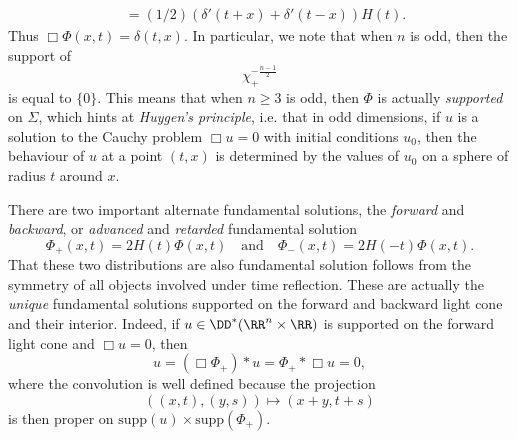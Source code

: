 \begin{example}
\begin{align*}
        &= (1/2) \left( \delta'(t + x) + \delta'(t - x) \right) H(t).
    \end{align*}
    Thus $\Box \Phi(x,t) = \delta(t,x)$. In particular, we note that when $n$ is odd, then the support of
    \[ \chi_+^{- \frac{n-1}{2}} \]
    is equal to $\{ 0 \}$. This means that when $n \geq 3$ is odd, then $\Phi$ is actually \emph{supported} on $\Sigma$, which hints at \emph{Huygen's principle}, i.e. that in odd dimensions, if $u$ is a solution to the Cauchy problem $\Box u = 0$ with initial conditions $u_0$, then the behaviour of $u$ at a point $(t,x)$ is determined by the values of $u_0$ on a sphere of radius $t$ around $x$.

    There are two important alternate fundamental solutions, the \emph{forward} and \emph{backward}, or \emph{advanced} and \emph{retarded} fundamental solution
    \[ \Phi_+(x,t) = 2 H(t) \Phi(x,t) \quad\text{and}\quad \Phi_-(x,t) = 2 H(-t) \Phi(x,t). \]
    That these two distributions are also fundamental solution follows from the symmetry of all objects involved under time reflection. These are actually the \emph{unique} fundamental solutions supported on the forward and backward light cone and their interior. Indeed, if $u \in \DD^*(\RR^n \times \RR)$ is supported on the forward light cone and $\Box u = 0$, then
    \[ u = (\Box \Phi_+) * u = \Phi_+ * \Box u = 0, \]
    where the convolution is well defined because the projection
    \[ ((x,t), (y,s)) \mapsto (x + y, t + s) \]
    is then proper on $\text{supp}(u) \times \text{supp}(\Phi_+)$.


\end{example}
